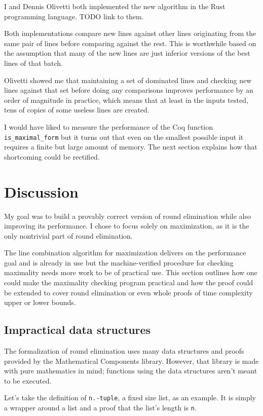 \documentclass[english, 12pt, a4paper, sci, a-1b, online]{aaltothesis}
\newcommand\icoq[1]{\texttt{#1}}
\begin{document}
I and Dennis Olivetti both implemented the new algorithm in the Rust programming language. TODO link to them.

Both implementations compare new lines against other lines originating from the same pair of lines before comparing against the rest. This is worthwhile based on the assumption that many of the new lines are just inferior versions of the best lines of that batch.

Olivetti showed me that maintaining a set of dominated lines and checking new lines against that set before doing any comparisons improves performance by an order of magnitude in practice, which means that at least in the inputs tested, tens of copies of some useless lines are created.

I would have liked to measure the performance of the Coq function \icoq{is_maximal_form} but it turns out that even on the smallest possible input it requires a finite but large amount of memory. The next section explains how that shortcoming could be rectified.


\section{Discussion}

My goal was to build a provably correct version of round elimination while also improving its performance. I chose to focus solely on maximization, as it is the only nontrivial part of round elimination.

The line combination algorithm for maximization delivers on the performance goal and is already in use but the machine-verified procedure for checking maximality needs more work to be of practical use. This section outlines how one could make the maximality checking program practical and how the proof could be extended to cover round elimination or even whole proofs of time complexity upper or lower bounds.

\subsection{Impractical data structures}\label{badds}

The formalization of round elimination uses many data structures and proofs provided by the Mathematical Components library. However, that library is made with pure mathematics in mind; functions using the data structures aren't meant to be executed.

Let's take the definition of \icoq{n.-tuple}, a fixed size list, as an example. It is simply a wrapper around a list and a proof that the list's length is \icoq{n}.
\end{document}
